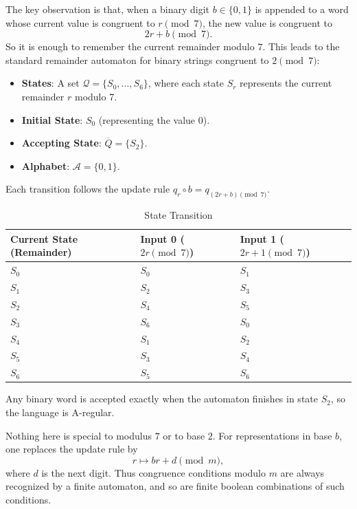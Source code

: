 The key observation is that, when a binary digit $b \in \{0,1\}$ is appended to a word whose
current value is congruent to $r \pmod{7}$, the new value is congruent to
\begin{equation*}
    2r + b \pmod{7}.
\end{equation*}
So it is enough to remember the current remainder modulo $7$. This leads to the standard
remainder automaton for binary strings congruent to $2 \pmod{7}$:
\begin{itemize}
    \item \textbf{States}: A set $\mathcal{Q} = \{S_{0}, \dots, S_{6}\}$, where each state $S_{r}$ represents the current remainder $r$ modulo 7.
    \item \textbf{Initial State}: $S_{0}$ (representing the value 0).
    \item \textbf{Accepting State}: $\overline{Q} = \{S_{2}\}$.
    \item \textbf{Alphabet}: $\mathcal{A} = \{0, 1\}$.
\end{itemize}
Each transition follows the update rule $q_{r} \circ b = q_{(2r + b) \pmod{7}}$.
\begin{table}[H]
    \centering
    \caption{State Transition}
    \label{tab:flexible}
    \begin{tabularx}{\textwidth}{XXX}  %
        \toprule
        Current State (Remainder) & Input 0 ($2r \pmod{7}$) & Input 1 ($2r + 1 \pmod{7}$) \\
        \midrule
        $S_{0}$ & $S_{0}$ & $S_{1}$ \\
        $S_{1}$ & $S_{2}$ & $S_{3}$ \\
        $S_{2}$ & $S_{4}$ & $S_{5}$ \\
        $S_{3}$ & $S_{6}$ & $S_{0}$ \\
        $S_{4}$ & $S_{1}$ & $S_{2}$ \\
        $S_{5}$ & $S_{3}$ & $S_{4}$ \\
        $S_{6}$ & $S_{5}$ & $S_{6}$ \\
        \bottomrule
    \end{tabularx}
\end{table}
Any binary word is accepted exactly when the automaton finishes in state $S_{2}$, so the
language is A-regular.

Nothing here is special to modulus $7$ or to base $2$. For representations in base $b$, one
replaces the update rule by
\begin{equation*}
    r \mapsto br + d \pmod{m},
\end{equation*}
where $d$ is the next digit. Thus congruence conditions modulo $m$ are always recognized by
a finite automaton, and so are finite boolean combinations of such conditions.

